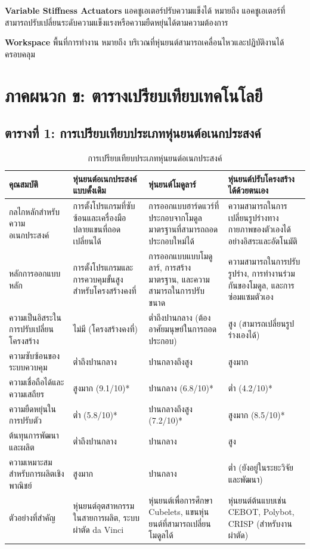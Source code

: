\documentclass[a4paper]{article}
\begin{document}
\textbf{Variable Stiffness Actuators} แอคชูเอเตอร์ปรับความแข็งได้ หมายถึง แอคชูเอเตอร์ที่สามารถปรับเปลี่ยนระดับความแข็งแรงหรือความยืดหยุ่นได้ตามความต้องการ

\textbf{Workspace} พื้นที่การทำงาน หมายถึง บริเวณที่หุ่นยนต์สามารถเคลื่อนไหวและปฏิบัติงานได้ครอบคลุม

\section{ภาคผนวก ข: ตารางเปรียบเทียบเทคโนโลยี}

\subsection{ตารางที่ 1: การเปรียบเทียบประเภทหุ่นยนต์อเนกประสงค์}

\begin{table}[!htbp]
\centering
\small
\caption{การเปรียบเทียบประเภทหุ่นยนต์อเนกประสงค์}
\begin{tabular}{|p{2.5cm}|p{4cm}|p{4cm}|p{4cm}|}
\hline
\textbf{คุณสมบัติ} & \textbf{หุ่นยนต์อเนกประสงค์แบบดั้งเดิม} & \textbf{หุ่นยนต์โมดูลาร์} & \textbf{หุ่นยนต์ปรับโครงสร้างได้ด้วยตนเอง} \\
\hline
กลไกหลักสำหรับ\-ความอเนกประสงค์ & การตั้งโปรแกรมที่ซับซ้อนและเครื่องมือปลายแขนที่ถอดเปลี่ยนได้ & การออกแบบฮาร์ดแวร์ที่ประกอบจากโมดูลมาตรฐานที่สามารถถอดประกอบใหม่ได้ & ความสามารถในการเปลี่ยนรูปร่างทางกายภาพของตัวเองได้อย่างอิสระและอัตโนมัติ \\
\hline
หลักการออกแบบหลัก & การตั้งโปรแกรมและการควบคุมขั้นสูงสำหรับโครงสร้างคงที่ & การออกแบบแบบโมดูลาร์, การสร้างมาตรฐาน, และความสามารถในการปรับขนาด & ความสามารถในการปรับรูปร่าง, การทำงานร่วมกันของโมดูล, และการซ่อมแซมตัวเอง \\
\hline
ความเป็นอิสระในการ\-ปรับเปลี่ยนโครงสร้าง & ไม่มี (โครงสร้างคงที่) & ต่ำถึงปานกลาง (ต้องอาศัยมนุษย์ในการถอดประกอบ) & สูง (สามารถเปลี่ยนรูปร่างเองได้) \\
\hline
ความซับซ้อนของ\-ระบบควบคุม & ต่ำถึงปานกลาง & ปานกลางถึงสูง & สูงมาก \\
\hline
ความเชื่อถือได้และ\-ความเสถียร & สูงมาก (9.1/10)* & ปานกลาง (6.8/10)* & ต่ำ (4.2/10)* \\
\hline
ความยืดหยุ่นในการ\-ปรับตัว & ต่ำ (5.8/10)* & ปานกลางถึงสูง (7.2/10)* & สูงมาก (8.5/10)* \\
\hline
ต้นทุนการพัฒนาและ\-ผลิต & ต่ำถึงปานกลาง & ปานกลาง & สูง \\
\hline
ความเหมาะสมสำหรับ\-การผลิตเชิงพาณิชย์ & สูงมาก & ปานกลาง & ต่ำ (ยังอยู่ในระยะวิจัยและพัฒนา) \\
\hline
ตัวอย่างที่สำคัญ & หุ่นยนต์อุตสาหกรรมในสายการผลิต, ระบบผ่าตัด da Vinci & หุ่นยนต์เพื่อการศึกษา Cubelets, แขนหุ่นยนต์ที่สามารถเปลี่ยนโมดูลได้ & หุ่นยนต์ต้นแบบเช่น CEBOT, Polybot, CRISP (สำหรับงานผ่าตัด) \\
\hline
\end{tabular}
\end{table}
\end{document}
